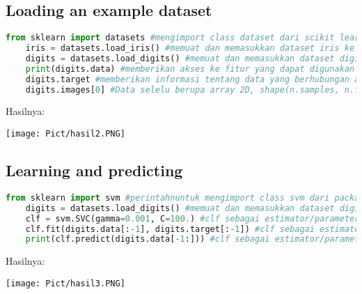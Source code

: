 \documentclass{homework}
\begin{document}
\subsection{Loading an example dataset}
\begin{lstlisting}[language=Python]
    from sklearn import datasets #mengimport class dataset dari scikit learn library
    iris = datasets.load_iris() #memuat dan memasukkan dataset iris ke variabel bernama iris
    digits = datasets.load_digits() #memuat dan memasukkan dataset digits ke variabel digits
    print(digits.data) #memberikan akses ke fitur yang dapat digunakan untuk mengklasifikasikan sample digit dan menampilkan di console
    digits.target #memberikan informasi tentang data yang berhubungan atau juga dapat dijadikan sebagai label
    digits.images[0] #Data selelu berupa array 2D, shape(n.samples, n.features), meskipun data aslinya mungkin memiliki bentuk yang berbeda
\end{lstlisting}
Hasilnya:
\begin{center}
    \texttt{[image: Pict/hasil2.PNG]}
\end{center}

\subsection{Learning and predicting}
\begin{lstlisting}[language=Python]
    from sklearn import svm #perintahnuntuk mengimport class svm dari packaged sklearn
    digits = datasets.load_digits() #memuat dan memasukkan dataset digits ke variable digits
    clf = svm.SVC(gamma=0.001, C=100.) #clf sebagai estimator/parameter, svm.SVC sebagai class, gamma sebagai parameter untuk menetapkan nilai secara manual
    clf.fit(digits.data[:-1], digits.target[:-1]) #clf sebagai estimator/parameter, f i t sebagai metode, digits.data sebagai item, [:1] sebagai syntax pythonnya dan menampilkan outputannya
    print(clf.predict(digits.data[-1:])) #clf sebagai estimator/parameter, predict sebagai metode lainnya, digits.data sebagai item dan menampilkan outputannya
\end{lstlisting}
Hasilnya:
\begin{center}
    \texttt{[image: Pict/hasil3.PNG]}
\end{center}
\end{document}
